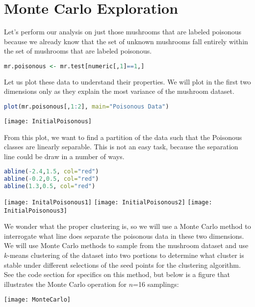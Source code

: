 \documentclass{article}
\begin{document}
\section{Monte Carlo Exploration}

Let's perform our analysis on just those mushrooms that are labeled poisonous
because we already know that the set of unknown mushrooms fall entirely within
the set of mushrooms that are labeled poisonous. 
\begin{lstlisting}[language=R, frame=single]
mr.poisonous <- mr.test[numeric[,1]==1,]
\end{lstlisting}

Let us plot these data to understand their properties. We will plot in the first
two dimensions only as they explain the most variance of the mushroom dataset.
\begin{lstlisting}[language=R, frame=single]
plot(mr.poisonous[,1:2], main="Poisonous Data")
\end{lstlisting}
\begin{center}
\texttt{[image: InitialPoisonous]}
\end{center}

From this plot, we want to find a partition of the data such that the Poisonous classes are linearly separable. This is not an easy task, because the separation line could be draw in a number of ways.
\begin{lstlisting}[language=R, frame=single]
abline(-2.4,1.5, col="red")
abline(-0.2,0.5, col="red")
abline(1.3,0.5, col="red")
\end{lstlisting}
\begin{center}
\texttt{[image: InitalPoisonous1]}
\texttt{[image: InitialPoisonous2]}
\texttt{[image: InitialPoisonous3]}
\end{center}


We wonder what the proper clustering is, so we will use a Monte Carlo 
method to interrogate what line does separate the poisonous data in these
two dimensions.
We will use Monte Carlo methods to sample from the mushroom dataset and use $k$-means clustering
of the dataset into two portions to determine what cluster is stable under
different selections of the seed points for the clustering algorithm. See the code section for specifics on this method, but below is a figure that illustrates the Monte Carlo operation for $n$=16 samplings:
\begin{center}
\texttt{[image: MonteCarlo]}
\end{center}
\end{document}
